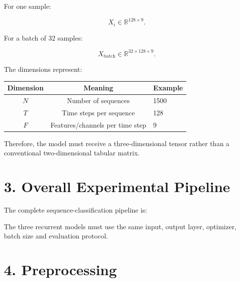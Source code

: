 \documentclass[10pt]{article}
\begin{document}
For one sample:

\[
X_i\in\mathbb{R}^{128\times9}.
\]

For a batch of 32 samples:

\[
X_{\mathrm{batch}}\in\mathbb{R}^{32\times128\times9}.
\]

The dimensions represent:

\begin{center}
\begin{tabular}{|c|c|l|}
\hline
Dimension & Meaning & Example\\
\hline
$N$ & Number of sequences & 1500\\
$T$ & Time steps per sequence & 128\\
$F$ & Features/channels per time step & 9\\
\hline
\end{tabular}
\end{center}

Therefore, the model must receive a three-dimensional tensor rather than a
conventional two-dimensional tabular matrix.

\section*{3. Overall Experimental Pipeline}

The complete sequence-classification pipeline is:

\begin{center}
\end{center}

The three recurrent models must use the same input, output layer, optimizer,
batch size and evaluation protocol.

\section*{4. Preprocessing}
\end{document}

